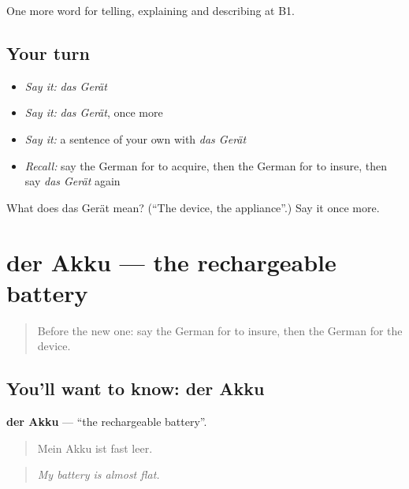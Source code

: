 \begin{grammarlens}[title={What you've built}]
One more word for telling, explaining and describing at B1.
\end{grammarlens}

\subsection*{Your turn}
\begin{itemize}
\raggedright
  \item \emph{Say it:} \emph{das Gerät}
  \item \emph{Say it:} \emph{das Gerät}, once more
  \item \emph{Say it:} a sentence of your own with \emph{das Gerät}
  \item \emph{Recall:} say the German for to acquire, then the German for to insure, then say \emph{das Gerät} again
\end{itemize}

\begin{tcolorbox}[breakable,colback=teal!4,colframe=teal!35!black,title={Before you move on}]
What does das Gerät mean? (\textquotedblleft{}The device, the appliance\textquotedblright{}.) Say it once more.
\end{tcolorbox}
\section[der Akku]{der Akku — the rechargeable battery}

\label{lesson:GE-C392-akku}



\begin{quote}
Before the new one: say the German for to insure, then the German for the device.
\end{quote}

\subsection*{You'll want to know: der Akku}
\textbf{der Akku} — \textquotedblleft{}the rechargeable battery\textquotedblright{}.

\begin{quote}
Mein Akku ist fast leer.
\end{quote}

\begin{quote}
\emph{My battery is almost flat.}
\end{quote}

